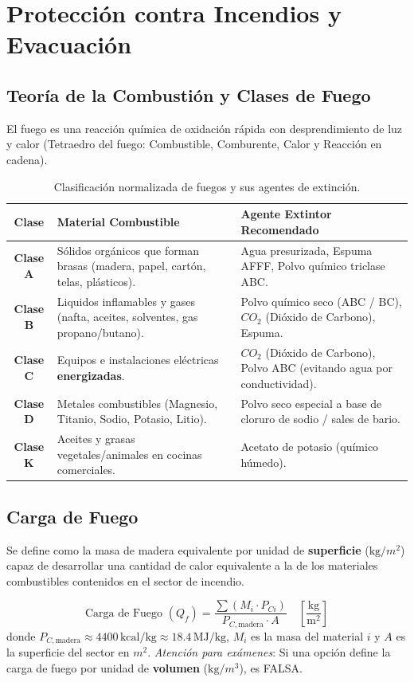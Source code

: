 \documentclass[]{informeutn}
\begin{document}
\chapter{Protección contra Incendios y Evacuación}

\section{Teoría de la Combustión y Clases de Fuego}
El fuego es una reacción química de oxidación rápida con desprendimiento de luz y calor (Tetraedro del fuego: Combustible, Comburente, Calor y Reacción en cadena).

\begin{table}[H]
\centering
\begin{tabular}{|c|p{4.5cm}|p{6cm}|}
\hline
\rowcolor{blue!15}\textbf{Clase} & \textbf{Material Combustible} & \textbf{Agente Extintor Recomendado} \\ \hline
\textbf{Clase A} & Sólidos orgánicos que forman brasas (madera, papel, cartón, telas, plásticos). & Agua presurizada, Espuma AFFF, Polvo químico triclase ABC. \\ \hline
\textbf{Clase B} & Liquidos inflamables y gases (nafta, aceites, solventes, gas propano/butano). & Polvo químico seco (ABC / BC), $CO_2$ (Dióxido de Carbono), Espuma. \\ \hline
\textbf{Clase C} & Equipos e instalaciones eléctricas \textbf{energizadas}. & $CO_2$ (Dióxido de Carbono), Polvo ABC (evitando agua por conductividad). \\ \hline
\textbf{Clase D} & Metales combustibles (Magnesio, Titanio, Sodio, Potasio, Litio). & Polvo seco especial a base de cloruro de sodio / sales de bario. \\ \hline
\textbf{Clase K} & Aceites y grasas vegetales/animales en cocinas comerciales. & Acetato de potasio (químico húmedo). \\ \hline
\end{tabular}
\caption{Clasificación normalizada de fuegos y sus agentes de extinción.}
\end{table}

\section{Carga de Fuego}
\begin{tcolorbox}[title=Definición Oficial de Carga de Fuego (Dec. 351/79 Anexo III)]
Se define como la masa de madera equivalente por unidad de \textbf{superficie} ($\text{kg}/m^2$) capaz de desarrollar una cantidad de calor equivalente a la de los materiales combustibles contenidos en el sector de incendio.
\end{tcolorbox}
\begin{equation}
\text{Carga de Fuego } (Q_f) = \frac{\sum (M_i \cdot P_{Ci})}{P_{C,\text{madera}} \cdot A} \quad \left[\frac{\text{kg}}{\text{m}^2}\right]
\end{equation}
donde $P_{C,\text{madera}} \approx 4400\,\text{kcal/kg} \approx 18.4\,\text{MJ/kg}$, $M_i$ es la masa del material $i$ y $A$ es la superficie del sector en $m^2$.
\textit{Atención para exámenes}: Si una opción define la carga de fuego por unidad de \textbf{volumen} ($\text{kg}/m^3$), es FALSA.
\end{document}
